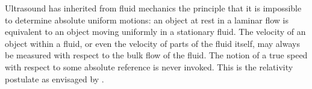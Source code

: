 Ultrasound has inherited from fluid mechanics the principle that it is impossible to determine absolute uniform motions:
an object at rest in a laminar flow is equivalent to an object moving uniformly in a stationary fluid.
The velocity of an object within a fluid, or even the velocity of parts of the fluid itself, may always be measured with respect to the bulk flow of the fluid.
The notion of a true speed with respect to some absolute reference is never  invoked.
This is the relativity postulate as envisaged by \Poincare.







